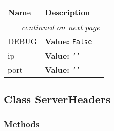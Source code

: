     \vspace{-1cm}
\hspace{\varindent}\begin{longtable}{|p{\varnamewidth}|p{\vardescrwidth}|l}
\cline{1-2}
\cline{1-2} \centering \textbf{Name} & \centering \textbf{Description}& \\
\cline{1-2}
\endhead\cline{1-2}\multicolumn{3}{r}{\small\textit{continued on next page}}\\\endfoot\cline{1-2}
\endlastfoot\raggedright D\-E\-B\-U\-G\- & \raggedright \textbf{Value:} 
{\tt False}&\\
\cline{1-2}
\raggedright i\-p\- & \raggedright \textbf{Value:} 
{\tt \texttt{'}\texttt{}\texttt{'}}&\\
\cline{1-2}
\raggedright p\-o\-r\-t\- & \raggedright \textbf{Value:} 
{\tt \texttt{'}\texttt{}\texttt{'}}&\\
\cline{1-2}
\end{longtable}



\subsection{Class ServerHeaders}

    \label{Headers:ServerHeaders}


  \subsubsection{Methods}

    \label{Headers:ServerHeaders:__init__}

    \vspace{0.5ex}

